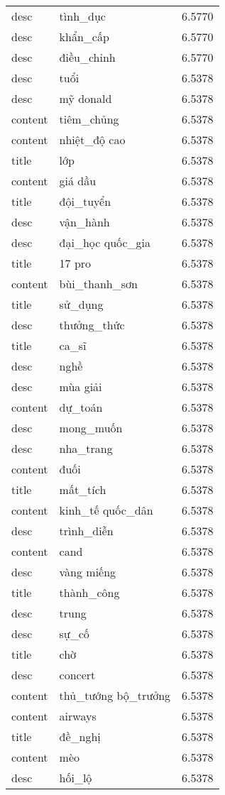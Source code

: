 \documentclass{article}
\begin{document}
\begin{tabular}{lll}
desc & tình\_dục & 6.5770\\
desc & khẩn\_cấp & 6.5770\\
desc & điều\_chỉnh & 6.5770\\
desc & tuổi & 6.5378\\
desc & mỹ donald & 6.5378\\
content & tiêm\_chủng & 6.5378\\
content & nhiệt\_độ cao & 6.5378\\
title & lớp & 6.5378\\
content & giá dầu & 6.5378\\
title & đội\_tuyển & 6.5378\\
desc & vận\_hành & 6.5378\\
desc & đại\_học quốc\_gia & 6.5378\\
title & 17 pro & 6.5378\\
content & bùi\_thanh\_sơn & 6.5378\\
title & sử\_dụng & 6.5378\\
desc & thưởng\_thức & 6.5378\\
title & ca\_sĩ & 6.5378\\
desc & nghề & 6.5378\\
desc & mùa giải & 6.5378\\
content & dự\_toán & 6.5378\\
desc & mong\_muốn & 6.5378\\
desc & nha\_trang & 6.5378\\
content & đuối & 6.5378\\
title & mất\_tích & 6.5378\\
content & kinh\_tế quốc\_dân & 6.5378\\
desc & trình\_diễn & 6.5378\\
content & cand & 6.5378\\
desc & vàng miếng & 6.5378\\
title & thành\_công & 6.5378\\
desc & trung & 6.5378\\
desc & sự\_cố & 6.5378\\
title & chờ & 6.5378\\
desc & concert & 6.5378\\
content & thủ\_tướng bộ\_trưởng & 6.5378\\
content & airways & 6.5378\\
title & đề\_nghị & 6.5378\\
content & mèo & 6.5378\\
desc & hối\_lộ & 6.5378\\

\end{tabular}
\end{document}
